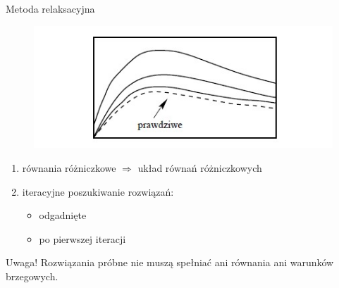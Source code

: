 \begin{frame}{Metoda relaksacyjna}
	\begin{figure}
		\includegraphics[height=0.35\textheight]{img/relaksacyjna.jpg}
	\end{figure}
    \begin{enumerate}
      \item równania różniczkowe $\Rightarrow$ układ równań różniczkowych
      \item iteracyjne poszukiwanie rozwiązań:
          \begin{itemize}
            \item odgadnięte
            \item po pierwszej iteracji
          \end{itemize}
    \end{enumerate}
    \begin{block}{Uwaga!}
    	Rozwiązania próbne nie muszą spełniać ani równania ani warunków brzegowych. 
    \end{block}
\end{frame}
